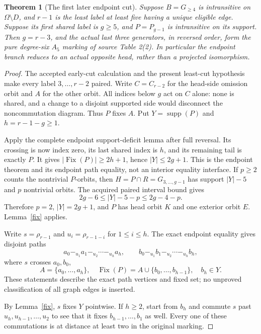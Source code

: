 \documentclass[11pt,a4paper]{article}
\newtheorem{theorem}[lemma]{Theorem}
\begin{document}
\begin{theorem}[The first later endpoint cut]
\label{endpoint}
Suppose $B=G_{\ge4}$ is intransitive on $\Omega\setminus D$,
and $r-1$ is the least label at least five having a unique
eligible edge. Suppose its first shared label is $g\ge5$,
and $P=P_{g-1}$ is intransitive on its support. Then
$g=r-3$, and the actual last three generators, in reversed
order, form the pure degree-six $A_5$ marking of source
Table 2(2). In particular the endpoint branch reduces to an
actual opposite head, rather than a projected isomorphism.
\end{theorem}
\begin{proof}
The accepted early-cut calculation and the present least-cut
hypothesis make every label $3,\ldots,r-2$ paired. Write
$C=C_{r-2}$ for the head-side omission orbit and $A$ for the
other orbit. All indices below $g$ act on $C$ alone: none
is shared, and a change to a disjoint supported side would
disconnect the noncommutation diagram. Thus $P$ fixes $A$.
Put $Y=\operatorname{supp}(P)$ and $h=r-1-g\ge1$.

Apply the complete endpoint support-deficit lemma after full
reversal. Its crossing is now index zero, its last shared
index is $h$, and its remaining tail is exactly $P$.
It gives $|\operatorname{Fix}(P)|\ge2h+1$, hence
$|Y|\le2g+1$. This is the endpoint theorem and its endpoint
path equality, not an interior equality interface.
If $p\ge2$ counts the nontrivial $P$-orbits, then
$H=P\cap R=G_{3,\ldots,g-1}$ has support $|Y|-5$ and
$p$ nontrivial orbits. The acquired paired interval bound gives
\[
 2g-6\le |Y|-5-p\le2g-4-p.
\]
Therefore $p=2$, $|Y|=2g+1$, and $P$ has head orbit $K$
and one exterior orbit $E$. Lemma~\ref{fix} applies.

Write $s=\rho_{r-1}$ and $u_i=\rho_{r-1-i}$ for
$1\le i\le h$. The exact endpoint equality gives disjoint
paths
\[
 a_0\mathrel{-_{u_1}}a_1\mathrel{-_{u_2}}\cdots
       \mathrel{-_{u_h}}a_h,
 \qquad
 b_0\mathrel{-_{u_1}}b_1\mathrel{-_{u_2}}\cdots
       \mathrel{-_{u_h}}b_h,
\]
where $s$ crosses $a_0,b_0$,
\[
 A=\{a_0,\ldots,a_h\},\quad
 \operatorname{Fix}(P)=A\cup\{b_0,\ldots,b_{h-1}\},
 \quad b_h\in Y.
\]
These statements describe the exact path vertices and fixed set;
no unproved classification of all graph edges is inserted.

By Lemma~\ref{fix}, $s$ fixes $Y$ pointwise. If $h\ge2$,
start from $b_h$ and commute $s$ past
$u_h,u_{h-1},\ldots,u_2$ to see that it fixes
$b_{h-1},\ldots,b_1$ as well. Every one of these commutations
is at distance at least two in the original marking.


\end{proof}
\end{document}
